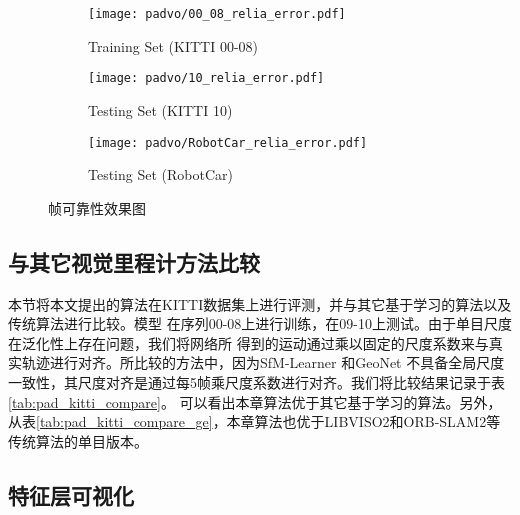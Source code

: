 \begin{figure}[h]
  \centering
  \begin{subfigure}[b]{0.95\textwidth}
    \texttt{[image: padvo/00\_08\_relia\_error.pdf]}
    \caption{Training Set (KITTI 00-08)}
    \label{fig:reli_error_1}
  \end{subfigure}
  \vspace*{2mm}

  \begin{subfigure}[b]{0.95\textwidth}
    \texttt{[image: padvo/10\_relia\_error.pdf]}
    \caption{Testing Set (KITTI 10)}
    \label{fig:reli_error_2}
  \end{subfigure}
  \vspace*{2mm}

  \begin{subfigure}[b]{0.95\textwidth}
    \texttt{[image: padvo/RobotCar\_relia\_error.pdf]}
    \caption{Testing Set (RobotCar)}
    \label{fig:reli_error_3}
  \end{subfigure}
  \caption{帧可靠性效果图}
  \label{fig:frame_reliability}
\end{figure}

\subsection{与其它视觉里程计方法比较}
\label{sec:pad_es_compare}


本节将本文提出的算法在KITTI数据集上进行评测，并与其它基于学习的算法以及传统算法进行比较。模型
在序列00-08上进行训练，在09-10上测试。由于单目尺度在泛化性上存在问题，我们将网络所
得到的运动通过乘以固定的尺度系数来与真实轨迹进行对齐。所比较的方法中，因为SfM-Learner\cite{zhou2017unsupervised}
和GeoNet \cite{yin2018geonet}不具备全局尺度一致性，其尺度对齐是通过每5帧乘尺度系数进行对齐。我们将比较结果记录于表\ref{tab:pad_kitti_compare}。
可以看出本章算法优于其它基于学习的算法。另外，从表\ref{tab:pad_kitti_compare_ge}，本章算法也优于LIBVISO2和ORB-SLAM2等传统算法的单目版本。

\subsection{特征层可视化}
\label{sec:pad_es_visu}

